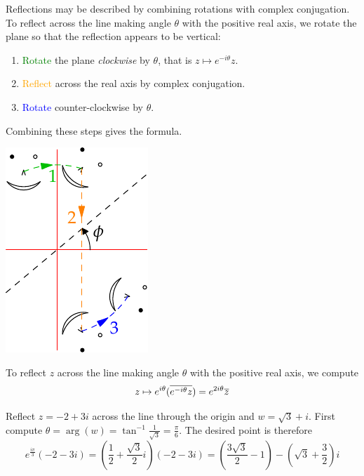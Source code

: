 \begin{minipage}[t]{0.73\linewidth}\vspace{0pt}
Reflections may be described by combining rotations with complex conjugation. To reflect across the line making angle $\theta$ with the positive real axis, we rotate the plane so that the reflection appears to be vertical:
\begin{enumerate}\itemsep0pt
  \item \textcolor{Green}{Rotate} the plane \emph{clockwise} by $\theta$, that is $z\mapsto e^{-i\theta}z$.
  \item \textcolor{orange}{Reflect} across the real axis by complex conjugation.
  \item \textcolor{blue}{Rotate} counter-clockwise by $\theta$.
\end{enumerate}
Combining these steps gives the formula.
\end{minipage}\hfill\begin{minipage}[t]{0.26\linewidth}\vspace{-5pt}
\flushright\includegraphics{complex-reflect}
\end{minipage}

\begin{thm}{}{}
To reflect $z$ across the line making angle $\theta$ with the positive real axis, we compute
\[z\mapsto e^{i\theta}(\overline{e^{-i\theta}z})=e^{2i\theta}\overline{z}\]
\end{thm}

\goodbreak

\begin{example}{}{}
Reflect $z=-2+3i$ across the line through the origin and $w=\sqrt 3+i$.\smallbreak
First compute $\theta=\arg(w)=\tan^{-1}\frac 1{\sqrt 3}=\frac\pi 6$. The desired point is therefore
\[e^{\frac{i\pi}3}(-2-3i)=\left(\frac 12+\frac{\sqrt 3}2i\right)(-2-3i) =\left(\frac{3\sqrt 3}2-1\right)-\left(\sqrt 3+\frac 32\right)i\]
\end{example}

